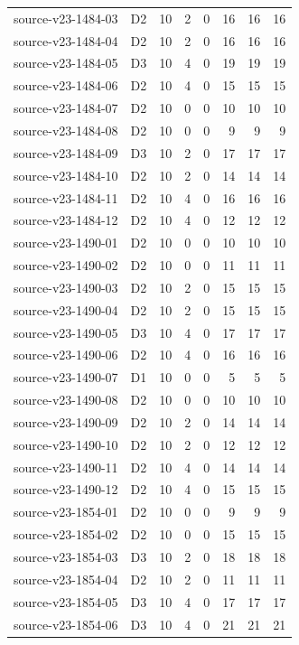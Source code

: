 \begin{longtable}{p{}lrrrrrr}
source-v23-1484-03 & D2 & 10 & 2 & 0 & 16 & 16 & 16\\
source-v23-1484-04 & D2 & 10 & 2 & 0 & 16 & 16 & 16\\
source-v23-1484-05 & D3 & 10 & 4 & 0 & 19 & 19 & 19\\
source-v23-1484-06 & D2 & 10 & 4 & 0 & 15 & 15 & 15\\
source-v23-1484-07 & D2 & 10 & 0 & 0 & 10 & 10 & 10\\
source-v23-1484-08 & D2 & 10 & 0 & 0 & 9 & 9 & 9\\
source-v23-1484-09 & D3 & 10 & 2 & 0 & 17 & 17 & 17\\
source-v23-1484-10 & D2 & 10 & 2 & 0 & 14 & 14 & 14\\
source-v23-1484-11 & D2 & 10 & 4 & 0 & 16 & 16 & 16\\
source-v23-1484-12 & D2 & 10 & 4 & 0 & 12 & 12 & 12\\
source-v23-1490-01 & D2 & 10 & 0 & 0 & 10 & 10 & 10\\
source-v23-1490-02 & D2 & 10 & 0 & 0 & 11 & 11 & 11\\
source-v23-1490-03 & D2 & 10 & 2 & 0 & 15 & 15 & 15\\
source-v23-1490-04 & D2 & 10 & 2 & 0 & 15 & 15 & 15\\
source-v23-1490-05 & D3 & 10 & 4 & 0 & 17 & 17 & 17\\
source-v23-1490-06 & D2 & 10 & 4 & 0 & 16 & 16 & 16\\
source-v23-1490-07 & D1 & 10 & 0 & 0 & 5 & 5 & 5\\
source-v23-1490-08 & D2 & 10 & 0 & 0 & 10 & 10 & 10\\
source-v23-1490-09 & D2 & 10 & 2 & 0 & 14 & 14 & 14\\
source-v23-1490-10 & D2 & 10 & 2 & 0 & 12 & 12 & 12\\
source-v23-1490-11 & D2 & 10 & 4 & 0 & 14 & 14 & 14\\
source-v23-1490-12 & D2 & 10 & 4 & 0 & 15 & 15 & 15\\
source-v23-1854-01 & D2 & 10 & 0 & 0 & 9 & 9 & 9\\
source-v23-1854-02 & D2 & 10 & 0 & 0 & 15 & 15 & 15\\
source-v23-1854-03 & D3 & 10 & 2 & 0 & 18 & 18 & 18\\
source-v23-1854-04 & D2 & 10 & 2 & 0 & 11 & 11 & 11\\
source-v23-1854-05 & D3 & 10 & 4 & 0 & 17 & 17 & 17\\
source-v23-1854-06 & D3 & 10 & 4 & 0 & 21 & 21 & 21\\

\end{longtable}
